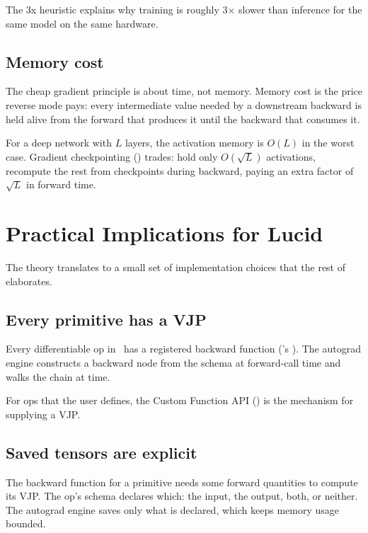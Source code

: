 The 3x heuristic explains why training is roughly 3$\times$
slower than inference for the same model on the same hardware.

\subsection{Memory cost}
\label{ssec:ad_theory:memory_cost}

The cheap gradient principle is about time, not memory. Memory
cost is the price reverse mode pays: every intermediate value
needed by a downstream backward is held alive from the forward
that produces it until the backward that consumes it.

For a deep network with $L$ layers, the activation memory is
$O(L)$ in the worst case. Gradient checkpointing
() trades: hold only
$O(\sqrt{L})$ activations, recompute the rest from checkpoints
during backward, paying an extra factor of $\sqrt{L}$ in forward
time.

\section{Practical Implications for Lucid}
\label{sec:ad_theory:implications}

The theory translates to a small set of implementation choices
that the rest of  elaborates.

\subsection{Every primitive has a VJP}
\label{ssec:ad_theory:every_vjp}

Every differentiable op in \Lucid\ has a registered backward
function ('s ). The
autograd engine constructs a backward node from the schema at
forward-call time and walks the chain at  time.

For ops that the user defines, the Custom Function API
() is the mechanism for supplying a
VJP.

\subsection{Saved tensors are explicit}
\label{ssec:ad_theory:saved_explicit}

The backward function for a primitive needs some forward
quantities to compute its VJP. The op's schema declares which:
the input, the output, both, or neither. The autograd engine
saves only what is declared, which keeps memory usage bounded.

